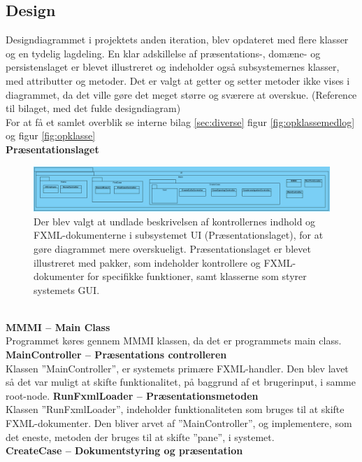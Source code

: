 \newpage
\subsection{Design}
Designdiagrammet i projektets anden iteration, blev opdateret med flere klasser og en tydelig lagdeling. En klar adskillelse af præsentations-, domæne- og persistenslaget er blevet illustreret og indeholder også subsystemernes klasser, med attributter og metoder. Det er valgt at getter og setter metoder ikke vises i diagrammet, da det ville gøre det meget større og sværere at overskue. (Reference til bilaget, med det fulde designdiagram)\\
For at få et samlet overblik se interne bilag \ref{sec:diverse} figur \ref{fig:opklassemedlog} og figur \ref{fig:opklasse}\\
\textbf{Præsentationslaget}
\begin{figure}[htb!]
  \includegraphics[width = \linewidth]{./PNG/design/UIopdateretKlassediagram.PNG} 
  \caption{Der blev valgt at undlade beskrivelsen af kontrollernes indhold og FXML-dokumenterne i subsystemet UI (Præsentationslaget), for at gøre diagrammet mere overskueligt. Præsentationslaget er blevet illustreret med pakker, som indeholder kontrollere og FXML-dokumenter for specifikke funktioner, samt klasserne som styrer systemets GUI.}
  \label{fig:2pre}
\end{figure}
\\\textbf{MMMI – Main Class}\\
Programmet køres gennem MMMI klassen, da det er programmets main class.\\
\textbf{MainController – Præsentations controlleren}\\
Klassen ”MainController”, er systemets primære FXML-handler. Den blev lavet så det var muligt at skifte funktionalitet, på baggrund af et brugerinput, i samme root-node.
\textbf{RunFxmlLoader – Præsentationsmetoden}\\
Klassen ”RunFxmlLoader”, indeholder funktionaliteten som bruges til at skifte FXML-dokumenter. Den bliver arvet af ”MainController”, og implementere, som det eneste, metoden der bruges til at skifte ”pane”, i systemet.\\
\textbf{CreateCase – Dokumentstyring og præsentation}\\
